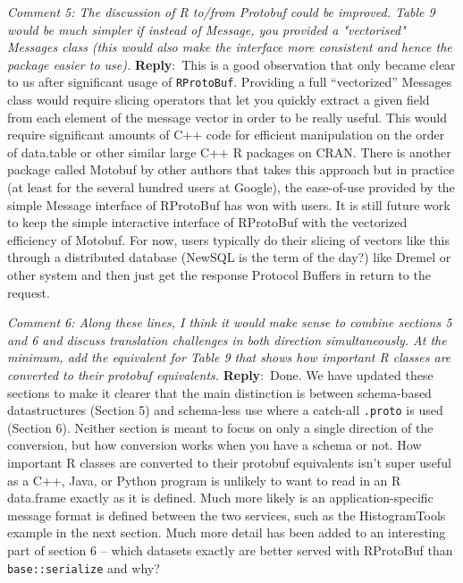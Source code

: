 \documentclass[10pt]{article}
\newcommand{\pointRaised}[2]{\smallskip %
  \textsl{{\fontseries{b}\selectfont #1}: #2}\newline}
\newcommand{\reply}[1]{\textbf{Reply}:\ #1 \smallskip } %
\begin{document}
\pointRaised{Comment 5}{The discussion of R to/from Protobuf could be improved. Table 9 would be
  much simpler if instead of Message, you provided a "vectorised"
  Messages class (this would also make the interface more consistent and
  hence the package easier to use).}
\reply{This is a good observation that only became clear to us after
  significant usage of \texttt{RProtoBuf}.  Providing a full ``vectorized'' Messages class would require slicing
  operators that let you quickly extract a given field from each
  element of the message vector in order to be really useful.  This
  would require significant amounts of C++ code for efficient
  manipulation on the order of data.table or other similar large C++ R
  packages on CRAN.  There is another package called Motobuf by other authors
  that takes this approach but in practice (at least for the several hundred
  users at Google), the ease-of-use provided by the simple Message interface of RProtoBuf
  has won with users.  It is still future work to keep the simple
  interactive interface of RProtoBuf with the vectorized efficiency of
  Motobuf.  For now, users typically do their slicing of vectors like
  this through a distributed database (NewSQL is the term of the day?)
  like Dremel or other system and then just get the response Protocol
  Buffers in return to the request.}

\pointRaised{Comment 6}{Along these lines, I think it would make sense to combine sections 5
  and 6 and discuss translation challenges in both direction
  simultaneously. At the minimum, add the equivalent for Table 9 that
  shows how important R classes are converted to their protobuf
  equivalents.}
\reply{Done. We have updated these sections to make it clearer that the main
  distinction is between schema-based datastructures (Section 5) and
  schema-less use where a catch-all \texttt{.proto} is used (Section 6).
  Neither section is meant to focus on only a single direction of the
  conversion, but how conversion works when you have a schema or not.
  How important R classes are converted to their protobuf equivalents
  isn't super useful as a C++, Java, or Python program is unlikely to
  want to read in an R data.frame exactly as it is defined.  Much more
  likely is an application-specific message format is defined between the
  two services, such as the HistogramTools example in the next section.
  Much more detail has been added to an interesting part of section 6 --
  which datasets exactly are better served with RProtoBuf than
  \texttt{base::serialize} and why?}
\end{document}
